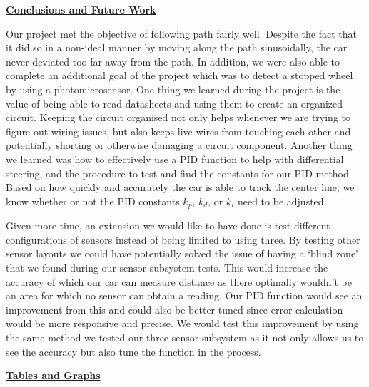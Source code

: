 \documentclass[twocolumn]{article}
\newcommand{\sectionTitle}[1]{ {\large\textbf{\uline{#1}}} \\ \vspace{1.5em} }
\begin{document}
\begin{flushleft}
			
		\sectionTitle{Conclusions and Future Work}
			
		\hspace{1em}Our project met the objective of following path fairly well. Despite the fact that it did so in a non-ideal manner by moving along the path sinusoidally, the car never deviated too far away from the path. In addition, we were also able to complete an additional goal of the project which was to detect a stopped wheel by using a photomicrosensor. One thing we learned during the project is the value of being able to read datasheets and using them to create an organized circuit. Keeping the circuit organised not only helps whenever we are trying to figure out wiring issues, but also keeps live wires from touching each other and potentially shorting or otherwise damaging a circuit component. Another thing we learned was how to effectively use a PID function to help with differential steering, and the procedure to test and find the constants for our PID method. Based on how quickly and accurately the car is able to track the center line, we know whether or not the PID constants $k_p$, $k_d$, or $k_i$ need to be adjusted. \\ \vspace{1em}
		
		\hspace{1em}Given more time, an extension we would like to have done is test different configurations of sensors instead of being limited to using three. By testing other sensor layouts we could have potentially solved the issue of having a `blind zone’ that we found during our sensor subsystem tests. This would increase the accuracy of which our car can measure distance as there optimally wouldn’t be an area for which no sensor can obtain a reading. Our PID function would see an improvement from this and could also be better tuned since error calculation would be more responsive and precise. We would test this improvement by using the same method we tested our three sensor subsystem as it not only allows us to see the accuracy but also tune the function in the process. \\ \vspace{-54em}

		\setlength\bibitemsep{0pt}
		\printbibliography[title={\uline{\large{References}}\vspace{-14em}}] 

		\pagebreak
		\sectionTitle{Tables and Graphs}
		
		\vspace{0em}
	

\end{flushleft}
\end{document}
